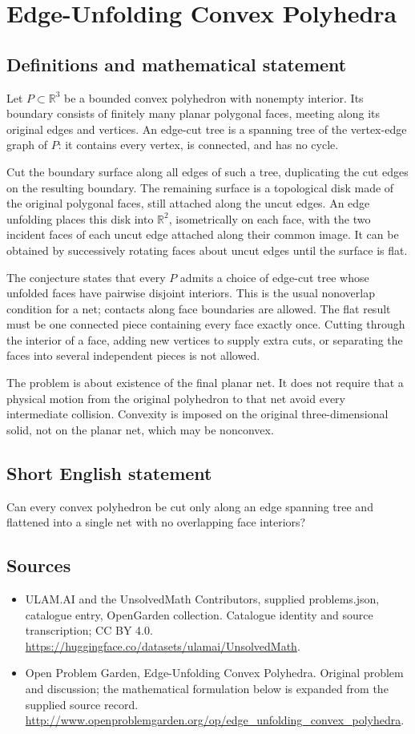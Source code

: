 \documentclass[11pt,a4paper]{article}
\begin{document}
\section*{Edge-Unfolding Convex Polyhedra}\label{statement}

\subsection{Definitions and mathematical statement}
Let $P\subset\mathbb R^3$ be a bounded convex polyhedron with nonempty
interior. Its boundary consists of finitely many planar polygonal faces,
meeting along its original edges and vertices. An edge-cut tree is a
spanning tree of the vertex-edge graph of $P$: it contains every vertex,
is connected, and has no cycle.

Cut the boundary surface along all edges of such a tree, duplicating the
cut edges on the resulting boundary. The remaining surface is a topological
disk made of the original polygonal faces, still attached along the uncut
edges. An edge unfolding places this disk into $\mathbb R^2$, isometrically
on each face, with the two incident faces of each uncut edge attached
along their common image. It can be obtained by successively rotating
faces about uncut edges until the surface is flat.

The conjecture states that every $P$ admits a choice of edge-cut tree
whose unfolded faces have pairwise disjoint interiors. This is the usual
nonoverlap condition for a net; contacts along face boundaries are allowed.
The flat result must be one connected piece containing every face exactly
once. Cutting through the interior of a face, adding new vertices to
supply extra cuts, or separating the faces into several independent pieces
is not allowed.

The problem is about existence of the final planar net. It does not
require that a physical motion from the original polyhedron to that net
avoid every intermediate collision. Convexity is imposed on the original
three-dimensional solid, not on the planar net, which may be nonconvex.
\subsection{Short English statement}
Can every convex polyhedron be cut only along an edge spanning tree and flattened into a single net with no overlapping face interiors?
\subsection{Sources}
\begin{itemize}
\item[S1] ULAM.AI and the UnsolvedMath Contributors, supplied problems.json, catalogue entry, OpenGarden collection. Catalogue identity and source transcription; CC BY 4.0.
\url{https://huggingface.co/datasets/ulamai/UnsolvedMath}.
\item[S2] Open Problem Garden, Edge-Unfolding Convex Polyhedra. Original problem and discussion; the mathematical formulation below is expanded from the supplied source record.
\url{http://www.openproblemgarden.org/op/edge_unfolding_convex_polyhedra}.
\end{itemize}
\end{document}
